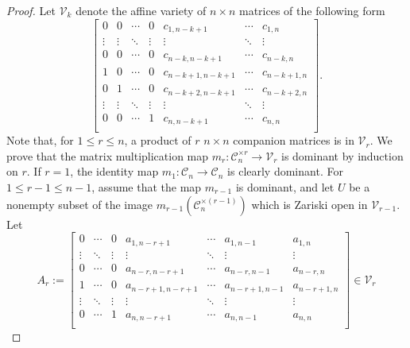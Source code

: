 \documentclass[reqno]{amsart}
\theoremstyle{definition}
\numberwithin{equation}{section}
\begin{document}
\begin{proof}
    Let $\mathcal{V}_k$ denote the affine variety of $n \times n$ matrices of the following form
    \begin{equation*}
        \begin{bmatrix}
            0 & 0 &\cdots & 0 & c_{1,n-k+1} & \cdots & c_{1,n}\\
            \vdots & \vdots & \ddots & \vdots & \vdots & \ddots & \vdots\\
            0 & 0 &\cdots & 0 & c_{n-k,n-k+1} & \cdots & c_{n-k,n}\\
            1 & 0 & \cdots & 0 & c_{n-k+1,n-k+1} & \cdots & c_{n-k+1,n}\\
            0 & 1 & \cdots & 0 & c_{n-k+2,n-k+1} & \cdots & c_{n-k+2,n}\\
            \vdots & \vdots & \ddots & \vdots & \vdots & \ddots & \vdots\\
             0 & 0 & \cdots & 1 & c_{n,n-k+1} & \cdots & c_{n,n}\\
        \end{bmatrix}.
    \end{equation*}
    Note that, for $1 \leq r \leq n$, a product of $r$ $n \times n$ companion matrices is in $\mathcal{V}_r$. We prove that the matrix multiplication map $m_r:\mathcal{C}_n^{\times r} \rightarrow \mathcal{V}_{r}$ is dominant by induction on $r$. If $r=1$, the identity map $m_1:\mathcal{C}_n \rightarrow \mathcal{C}_n$ is clearly dominant. For $1 \leq r-1 \leq n-1$, assume that the map $m_{r-1}$ is dominant, and let $U$ be a nonempty subset of the image  $m_{r-1}(\mathcal{C}_n^{\times (r-1)})$ which is Zariski open in $\mathcal{V}_{r-1}$. Let 
    \begin{equation*}
        A_r := \left[\begin{array}{ccc|ccc|c}
             0  &\cdots & 0 & a_{1,n-r+1} & \cdots & a_{1,n-1} & a_{1,n}\\
            \vdots  & \ddots & \vdots & \vdots & \ddots & \vdots & \vdots\\
            0  &\cdots & 0 & a_{n-r,n-r+1} & \cdots & a_{n-r,n-1} & a_{n-r,n}\\
            1  & \cdots & 0 & a_{n-r+1,n-r+1} & \cdots & a_{n-r+1,n-1} & a_{n-r+1,n}\\
            \vdots  & \ddots & \vdots & \vdots & \ddots & \vdots & \vdots \\
             0 &  \cdots & 1 & a_{n,n-r+1} & \cdots & a_{n,n-1} & a_{n,n}\\
        \end{array}\right] \in \mathcal{V}_r

\end{equation*}
\end{proof}
\end{document}
